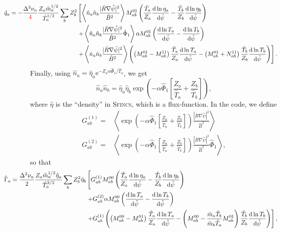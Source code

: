 \documentclass[12pt, a4paper]{article}
\newcommand{\e}{\ensuremath{\mathrm{e}}}
\renewcommand{\d}{\ensuremath{\mathrm{d}}}
\newcommand{\lang}{\left\langle}
\newcommand{\rang}{\right\rangle}
\begin{document}
\begin{equation}
\begin{aligned}
  \hspace*{-10ex} \hat{q}_a =  -\frac{\Delta^2 \nu_n}{\textcolor{red}{4}} \frac{Z_a\hat{m}_a^{1/2}}{\hat{T}_a^{1/2}} \sum_b Z_b^2 &\left[
    \lang \hat{n}_a \hat{n}_b\frac{|\bar{R}\nabla \hat{\psi}|^2}{\hat{B}^2 } \rang M_{ab}^{01}\left(\frac{\hat{T}_a}{Z_a}  \frac{\d \ln\eta_a}{\d \hat{\psi}} - \frac{\hat{T}_b}{Z_b}\frac{\d \ln\eta_b}{\d \hat{\psi}}\right) \right.\\
    &\left.+\lang \hat{n}_a \hat{n}_b\frac{|\bar{R}\nabla \hat{\psi}|^2}{\hat{B}^2 }  \hat{\Phi}_1 \rang \alpha M_{ab}^{01} \left(\frac{\d \ln T_a}{\d \hat{\psi}}-\frac{\d \ln T_b}{\d \hat{\psi}}\right) \right.\\
    &\left.+ \lang \hat{n}_a \hat{n}_b\frac{|\bar{R}\nabla \hat{\psi}|^2}{\hat{B}^2 } \rang \left(\left(M_{ab}^{01} - M_{ab}^{11}\right)\frac{ \hat{T}_a}{Z_a} \frac{\d \ln T_a}{\d \hat{\psi}}
    - \left(M_{ab}^{01} + N_{ab}^{11}\right)\frac{\hat{T}_b}{Z_b}\frac{\d \ln T_b}{\d \hat{\psi}}\right) \right].
\end{aligned}
\end{equation}
Finally, using $\hat{n}_a = \hat{\eta}_a \e^{-Z_a \alpha \hat{\Phi}_1/\hat{T}_a}$, we get
\begin{equation}
\hat{n}_a\hat{n}_b = \hat{\eta}_a \hat{\eta}_b \exp{\left(-\alpha\hat{\Phi}_1\left[\frac{Z_a}{\hat{T}_a} + \frac{Z_b}{\hat{T}_b}\right]\right)},
\end{equation}
where $\hat{\eta}$ is the ``density'' in \textsc{Sfincs}, which is a flux-function. In the code, we define
\begin{align}
  G_{ab}^{(1)} =& \lang \exp{\left(-\alpha\hat{\Phi}_1\left[\frac{Z_a}{\hat{T}_a} + \frac{Z_b}{\hat{T}_b}\right]\right)}\frac{|\bar{R}\nabla \hat{\psi}|^2}{\hat{B}^2 } \rang \\
  G_{ab}^{(2)} =& \lang \exp{\left(-\alpha\hat{\Phi}_1\left[\frac{Z_a}{\hat{T}_a} + \frac{Z_b}{\hat{T}_b}\right]\right)}\frac{|\bar{R}\nabla \hat{\psi}|^2}{\hat{B}^2 } \hat{\Phi}_1 \rang,
\end{align}
so that
\begin{equation}
\begin{aligned}
  \hspace*{-10ex} \hat{\Gamma}_a =   \frac{\Delta^2 \nu_n}{2}\frac{Z_a\hat{m}_a^{1/2} \hat{\eta}_a}{\hat{T}_a^{3/2}}\sum_b Z_b^2 \hat{\eta}_b&\left[
    G_{ab}^{(1)} M_{ab}^{00} \left(\frac{ \hat{T}_a}{Z_a}  \frac{\d \ln\eta_a}{\d \hat{\psi}} -\frac{ \hat{T}_b}{Z_b}  \frac{\d \ln\eta_b}{\d \hat{\psi}}\right) \right.\\
    &\left.+    G_{ab}^{(2)} \alpha  M_{ab}^{00} \left(\frac{\d \ln T_a}{\d \hat{\psi}} -\frac{\d \ln T_b}{\d \hat{\psi}}\right) \right.\\
   &\left. +G_{ab}^{(1)}\left(  \left(M_{ab}^{00} - M_{ab}^{01}\right)\frac{ \hat{T}_a}{Z_a}\frac{\d \ln T_a}{\d \hat{\psi}} 
    - \left(M_{ab}^{00} - \frac{\hat{m}_a \hat{T}_b}{\hat{m}_b \hat{T}_a} M_{ab}^{01}\right)\frac{ \hat{T}_b}{Z_b}\frac{\d \ln T_b}{\d \hat{\psi}}\right)\right],
\end{aligned}
\end{equation}
\end{document}
